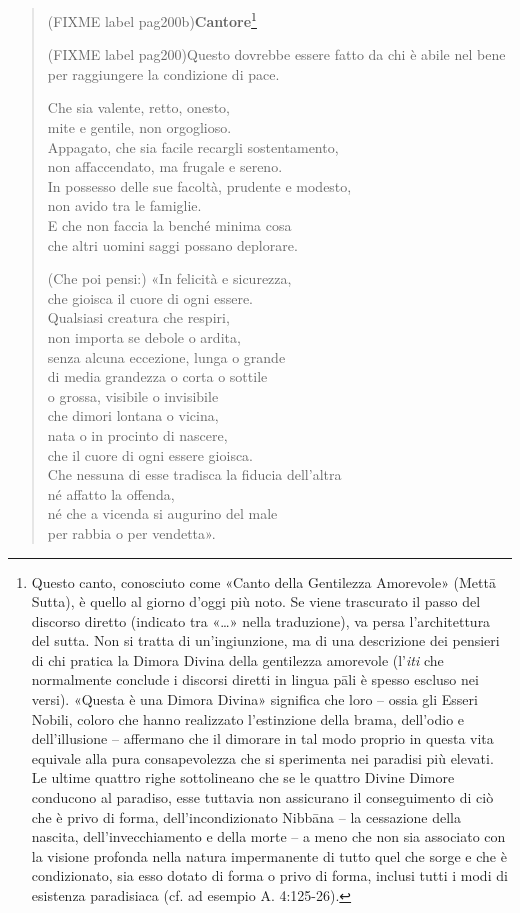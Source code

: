 \begin{quotation}
(FIXME label pag200b)\textbf{Cantore}\footnote{Questo canto, conosciuto come «Canto della Gentilezza Amorevole» (Mettā Sutta), è quello al giorno d’oggi più noto. Se viene trascurato il passo del discorso diretto (indicato tra «…» nella traduzione), va persa l’architettura del sutta. Non si tratta di un’ingiunzione, ma di una descrizione dei pensieri di chi pratica la Dimora Divina della gentilezza amorevole (l’\emph{iti} che normalmente conclude i discorsi diretti in lingua pāli è spesso escluso nei versi). «Questa è una Dimora Divina» significa che loro – ossia gli Esseri Nobili, coloro che hanno realizzato l’estinzione della brama, dell’odio e dell’illusione – affermano che il dimorare in tal modo proprio in questa vita equivale alla pura consapevolezza che si sperimenta nei paradisi più elevati. Le ultime quattro righe sottolineano che se le quattro Divine Dimore conducono al paradiso, esse tuttavia non assicurano il conseguimento di ciò che è privo di forma, dell’incondizionato Nibbāna – la cessazione della nascita, dell’invecchiamento e della morte – a meno che non sia associato con la visione profonda nella natura impermanente di tutto quel che sorge e che è condizionato, sia esso dotato di forma o privo di forma, inclusi tutti i modi di esistenza paradisiaca (cf. ad esempio A. 4:125-26).}


(FIXME label pag200)Questo dovrebbe essere fatto da chi è abile nel bene \\
per raggiungere la condizione di pace.


Che sia valente, retto, onesto, \\
mite e gentile, non orgoglioso. \\
Appagato, che sia facile recargli sostentamento, \\
non affaccendato, ma frugale e sereno. \\
In possesso delle sue facoltà, prudente e modesto, \\
non avido tra le famiglie. \\
E che non faccia la benché minima cosa \\
che altri uomini saggi possano deplorare.


(Che poi pensi:) «In felicità e sicurezza, \\
che gioisca il cuore di ogni essere. \\
Qualsiasi creatura che respiri, \\
non importa se debole o ardita, \\
senza alcuna eccezione, lunga o grande \\
di media grandezza o corta o sottile \\
o grossa, visibile o invisibile \\
che dimori lontana o vicina, \\
nata o in procinto di nascere, \\
che il cuore di ogni essere gioisca. \\
Che nessuna di esse tradisca la fiducia dell’altra \\
né affatto la offenda, \\
né che a vicenda si augurino del male \\
per rabbia o per vendetta».



\end{quotation}
